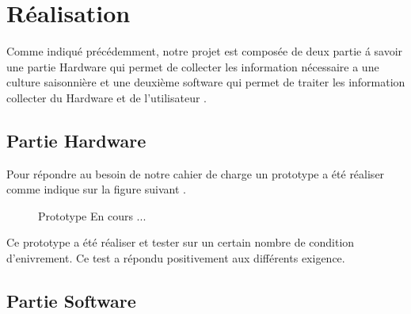 \section{Réalisation}
Comme indiqué précédemment, notre projet est composée de deux partie á savoir une partie Hardware qui permet de collecter les information nécessaire a une culture saisonnière  et une deuxième software  qui permet de traiter les information collecter du Hardware et de l’utilisateur .
\subsection{Partie Hardware}
Pour répondre au besoin de notre cahier de charge un prototype a été réaliser comme indique sur la figure suivant .

\begin{figure}[hbt]
\centering
\right
\label{fig: Prototype}

  \caption{Prototype En cours ...}
\end{figure}

Ce prototype a été réaliser et tester sur un certain nombre de condition 
d’enivrement. Ce test a répondu positivement aux différents exigence. 

\break
\newpage
\subsection{Partie Software }
